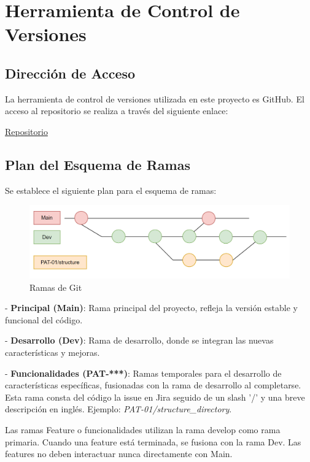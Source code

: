 \section{Herramienta de Control de Versiones}

\subsection{Dirección de Acceso}\label{sec:repo-git}
La herramienta de control de versiones utilizada en este proyecto es GitHub. El acceso al repositorio se realiza a través del siguiente enlace:

\href{https://github.com/orgs/proyecto-patrocinio/repositories}{Repositorio}

\subsection{Plan del Esquema de Ramas}
Se establece el siguiente plan para el esquema de ramas:


\begin{figure}[h]
    \centering
    \includegraphics[width=1\linewidth]{fig/branches.png}
    \caption{Ramas de Git}
    \label{fig:enter-label}
\end{figure}


- \textbf{Principal (Main)}: Rama principal del proyecto, refleja la versión estable y funcional del código.
  
- \textbf{Desarrollo (Dev)}: Rama de desarrollo, donde se integran las nuevas características y mejoras.

- \textbf{Funcionalidades (PAT-***)}: Ramas temporales para el desarrollo de características específicas, fusionadas con la rama de desarrollo al completarse.
Esta rama consta del código la issue en Jira seguido de un slash '/' y una breve descripción en inglés. Ejemplo: \textit{PAT-01/structure\_directory}.

Las ramas Feature o funcionalidades utilizan la rama develop como rama primaria. Cuando una feature está terminada, se fusiona con la rama Dev. Las features no deben interactuar nunca directamente con Main.

